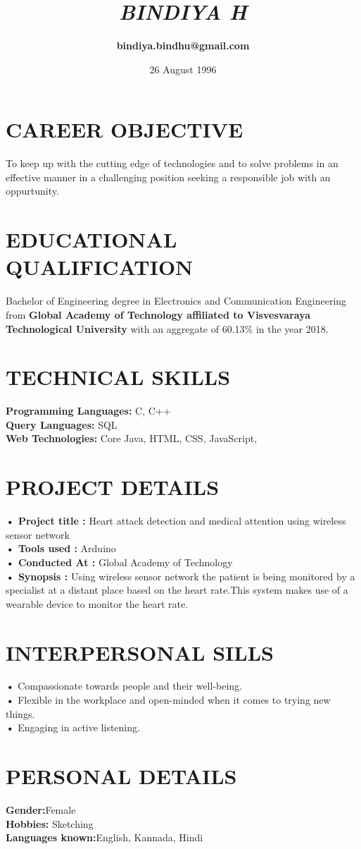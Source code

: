 \documentclass[11pt, oneside, a4paper]{article}
\title{\textit{\bf  BINDIYA H}}
\author{\bf bindiya.bindhu@gmail.com}
\date{26 August 1996}
\begin{document}
\maketitle

\section*{CAREER OBJECTIVE}
To keep up with the cutting edge of technologies and to solve problems in an effective manner in a challenging position seeking a responsible job with an oppurtunity.

\section*{EDUCATIONAL QUALIFICATION}
 Bachelor of Engineering degree in Electronics and Communication Engineering  from {\bf Global Academy of Technology affiliated to  Visvesvaraya Technological University}{  with an aggregate of 60.13\% in the year 2018.} 

\section*{TECHNICAL SKILLS}
{\bf Programming Languages: }{C, C++}
\\{\bf Query Languages:} {SQL}
\\ {\bf Web Technologies: }{Core Java, HTML, CSS, JavaScript,}

\section*{PROJECT DETAILS}
{\bf• Project title :}{ Heart attack detection and medical attention using wireless sensor network}
\\{\bf• Tools used : }{Arduino}
\\{\bf• Conducted At :} {Global Academy of Technology}
\\{\bf• Synopsis : }{Using wireless sensor network the patient is being monitored by a specialist at a distant place based on the heart rate.This system makes use of a wearable device to monitor the heart rate.}

\section*{INTERPERSONAL SILLS}
{\bf•}{ Compassionate towards people and their well-being.}
\\{\bf•}{ Flexible in the workplace and open-minded when it comes to trying new things.}
\\{\bf•}{ Engaging in active listening.}

\section*{PERSONAL DETAILS}
{\bf Gender:}Female
\\ {\bf Hobbies:} Sketching
\\ {\bf Languages known:}English, Kannada, Hindi
\end{document}
